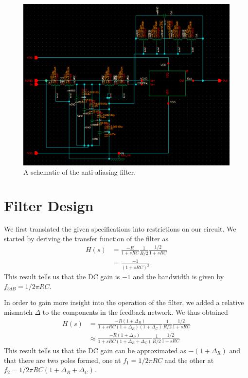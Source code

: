 \documentclass[journal,hidelinks]{IEEEtran}
\begin{document}
\begin{figure}[!htb]
  \centering
  \includegraphics[width=\textwidth]{schematics/filter.png}
  \caption{A schematic of the anti-aliasing filter.}
  \label{fig:filter}
\end{figure}

\section{Filter Design}

We first translated the given specifications into restrictions on our circuit. We started by deriving the transfer function of the filter as
\begin{align}
H(s) &= \frac{-R}{1 + s R C} \frac{1}{R/2} \frac{1/2}{1 + s R C} \\
     &= \frac{-1}{(1 + s R C)^2}
\end{align}
This result tells us that the DC gain is $-1$ and the bandwidth is given by $f_{3dB} = 1 / 2 \pi R C$.

In order to gain more insight into the operation of the filter, we added a relative mismatch $\Delta$ to the components in the feedback network. We thus obtained
\begin{align}
H(s) &= \frac{-R (1 + \Delta_R)}{1 + s R C (1 + \Delta_R) (1 + \Delta_C)} \frac{1}{R/2} \frac{1/2}{1 + s R C} \\
     &\approx \frac{-R (1 + \Delta_R)}{1 + s R C (1 + \Delta_R + \Delta_C)} \frac{1}{R/2} \frac{1/2}{1 + s R C}
\end{align}
This result tells us that the DC gain can be approximated as $-(1 + \Delta_R)$ and that there are two poles formed, one at $f_1 = 1 / 2 \pi R C$ and the other at $f_2 = 1 / 2 \pi R C (1 + \Delta_R + \Delta_C)$.
\end{document}
